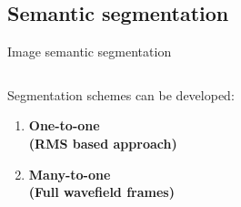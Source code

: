 \documentclass[10pt,aspectratio=169,dvipsnames]{beamer} %
\begin{document}
\subsection{Semantic segmentation}
\setcounter{subfigure}{0}
\begin{frame}{Image semantic segmentation}
	\begin{columns}[T]
		\begin{column}[c]{0.35\textwidth}
			Segmentation schemes can be developed:
			\medskip
			\begin{enumerate}
				\item \textbf{One-to-one \\(RMS based approach)} 
				\medskip
				\item \textbf{Many-to-one \\(Full wavefield frames)}
			\end{enumerate}
		\end{column}
		\begin{column}[c]{0.6\textwidth}
			\begin{figure}
				\centering
				\qquad
				\qquad
				\\
				\qquad
			\end{figure}
		\end{column}
	\end{columns}	
\end{frame}

\setcounter{subfigure}{0}
\end{document}
